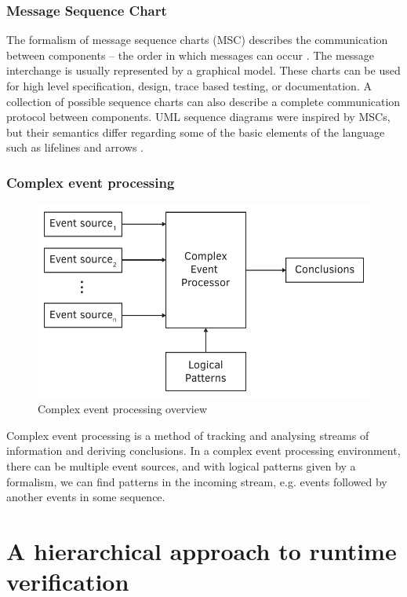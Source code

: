 \subsubsection{Message Sequence Chart}

The formalism of message sequence charts (MSC) describes the communication between components -- the order in which messages can occur \citep{msc} \citep{msc2}. The message interchange is usually represented by a graphical model. These charts can be used for high level specification, design, trace based testing, or documentation. A collection of possible sequence charts can also describe a complete communication protocol between components. UML sequence diagrams were inspired by MSCs, but their semantics differ regarding some of the basic elements of the language such as lifelines and arrows \citep{mscuml}.

\subsubsection{Complex event processing}

\begin{figure}[h]
	\centering
	\includegraphics[width=0.7\linewidth]{include/figures/chapter_1/CEP}
	\caption{Complex event processing overview}
	\label{fig:intro:vmodel}
\end{figure}

Complex event processing is a method of tracking and analysing streams of information and deriving conclusions. In a complex event processing environment, there can be multiple event sources, and with logical patterns given by a formalism, we can find patterns in the incoming stream, e.g. events followed by another events in some sequence.

\section{A hierarchical approach to runtime verification}

